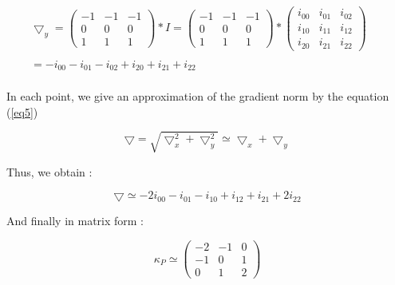 \documentclass[12pt,a4paper]{article}
\begin{document}
\vspace{1cm}

\begin{equation}\label{eq4}
\begin{matrix}
\bigtriangledown_y = \begin{pmatrix}
-1 & -1 & -1 \\ 
0 & 0 & 0 \\ 
1 & 1 & 1
\end{pmatrix}*I  = \begin{pmatrix}
-1 & -1 & -1 \\ 
0 & 0 & 0 \\ 
1 & 1 & 1
\end{pmatrix}* \begin{pmatrix}
i_{00} & i_{01} & i_{02} \\ 
i_{10} & i_{11} & i_{12}\\ 
i_{20} & i_{21} & i_{22}
\end{pmatrix}  \\ 
& & \\
 =  -i_{00}-i_{01}-i_{02}+i_{20}+i_{21}+i_{22} \\  
\end{matrix}
\end{equation}
 
\vspace{0.5cm}

In each point, we give an approximation of the gradient norm by the equation (\ref{eq5})

\begin{equation}\label{eq5}
\bigtriangledown = \sqrt{\bigtriangledown_x^2 + \bigtriangledown_y^2 } \simeq \bigtriangledown_x + \bigtriangledown_y
\end{equation}

\vspace{0.5cm}

Thus, we obtain :

\begin{equation}\label{eq6}
\bigtriangledown \simeq -2i_{00}-i_{01}-i_{10}+i_{12}+i_{21}+2i_{22} 
\end{equation}
 
\vspace{0.25cm}
 
And finally in matrix form : 

\begin{equation}\label{eq7}
\kappa_P  \simeq \begin{pmatrix}
-2 & -1 & 0\\ 
-1 & 0 & 1\\ 
0 & 1 & 2
\end{pmatrix}
\end{equation}
\end{document}
